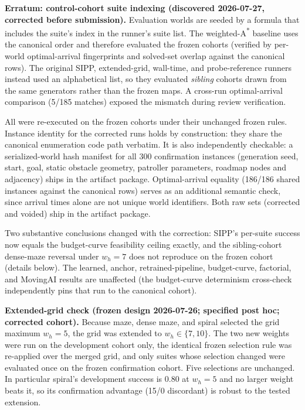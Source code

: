 \documentclass[letterpaper]{article} %
\begin{document}
\textbf{Erratum: control-cohort suite indexing (discovered 2026-07-27, corrected before submission).} Evaluation worlds are seeded by a formula that includes the suite's index in the runner's suite list. The weighted-A\textsuperscript{*} baseline uses the canonical order and therefore evaluated the frozen cohorts (verified by per-world optimal-arrival fingerprints and solved-set overlap against the canonical rows). The original SIPP, extended-grid, wall-time, and probe-reference runners instead used an alphabetical list, so they evaluated \emph{sibling} cohorts drawn from the same generators rather than the frozen maps. A cross-run optimal-arrival comparison (5/185 matches) exposed the mismatch during review verification.

All were re-executed on the frozen cohorts under their unchanged frozen rules. Instance identity for the corrected runs holds by construction: they share the canonical enumeration code path verbatim. It is also independently checkable: a serialized-world hash manifest for all 300 confirmation instances (generation seed, start, goal, static obstacle geometry, patroller parameters, roadmap nodes and adjacency) ships in the artifact package. Optimal-arrival equality (186/186 shared instances against the canonical rows) serves as an additional semantic check, since arrival times alone are not unique world identifiers. Both raw sets (corrected and voided) ship in the artifact package.

Two substantive conclusions changed with the correction: SIPP's per-suite success now equals the budget-curve feasibility ceiling exactly, and the sibling-cohort dense-maze reversal under $w_h{=}7$ does not reproduce on the frozen cohort (details below). The learned, anchor, retrained-pipeline, budget-curve, factorial, and MovingAI results are unaffected (the budget-curve determinism cross-check independently pins that run to the canonical cohort).

\textbf{Extended-grid check (frozen design 2026-07-26; specified post hoc; corrected cohort).} Because maze, dense maze, and spiral selected the grid maximum $w_h{=}5$, the grid was extended to $w_h \in \{7, 10\}$. The two new weights were run on the development cohort only, the identical frozen selection rule was re-applied over the merged grid, and only suites whose selection changed were evaluated once on the frozen confirmation cohort. Five selections are unchanged. In particular spiral's development success is 0.80 at $w_h{=}5$ and no larger weight beats it, so its confirmation advantage (15/0 discordant) is robust to the tested extension.
\end{document}
